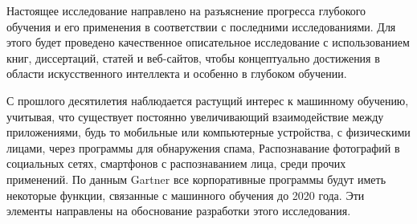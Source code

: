 \begin{frame}

    Настоящее исследование направлено на разъяснение прогресса глубокого обучения и его применения в соответствии с последними исследованиями.
    Для этого будет проведено качественное описательное исследование с использованием книг, диссертаций, статей и веб-сайтов,
    чтобы концептуально достижения в области искусственного интеллекта и особенно в глубоком обучении.

    С прошлого десятилетия наблюдается растущий интерес к машинному обучению, учитывая, что существует постоянно увеличивающий взаимодействие между приложениями, будь то мобильные или компьютерные устройства, с физическими лицами, через программы для обнаружения спама, Распознавание фотографий в социальных сетях, смартфонов с распознаванием лица, среди прочих применений.
    По данным Gartner все корпоративные программы будут иметь некоторые функции, связанные с машинного обучения до 2020 года.
    Эти элементы направлены на обоснование разработки этого исследования.

\end{frame}